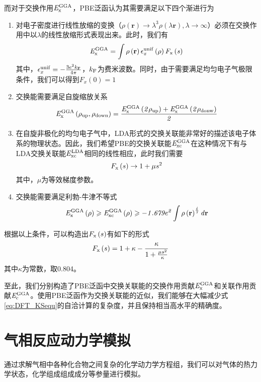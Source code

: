 而对于交换作用$\it E_{\rm x}^{\rm GGA} \it$，PBE泛函认为其需要满足以下四个渐进行为\chinesecolon
\begin{enumerate}
    \item 对电子密度进行线性放缩的变换（$\rho\left({\bm r}\right)\rightarrow \lambda^3\rho(\lambda {\bm r}), \lambda\rightarrow \infty$）必须在交换作用中以$\lambda$的线性放缩形式表现出来。此时，我们有\chinesecolon
    \[
        \it E_{\rm x}^{\rm GGA} \it=\int\rho\left({\mathbf r}\right)\epsilon_x^{\rm unif}\left(\rho\right)F_{\rm x}\left(s\right)
    \]
    其中，$\epsilon_x^{\rm unif}=-\frac{3e^2k_{\rm F}}{4\pi}$，$k_{\rm F}$为费米波数。同时，由于需要满足均匀电子气极限条件，我们可以得到$F_{x}\left(0\right)=1$
    \item 交换能需要满足自旋缩放关系\chinesecolon
    \[
        \it E_{\rm x}^{\rm GGA} \it\left(\rho_{\rm up},\rho_{\rm down}\right)=\frac{\it E_{\rm x}^{\rm GGA} \it\left(2\rho_{\rm up}\right)+\it E_{\rm x}^{\rm GGA} \it\left(2\rho_{\rm donw}\right)}{2}
    \]
    \item 在自旋非极化的均匀电子气中，LDA形式的交换关联能非常好的描述该电子体系的物理状态。因此，我们希望PBE的交换关联能$\it E_{\rm xc}^{\rm GGA} \it$在这种情况下有与LDA交换关联能$\it E_{\rm xc}^{\rm LDA} \it$相同的线性相应，此时我们需要\chinesecolon
    \[
        F_{\rm x}\left(s\right)\rightarrow 1+\mu s^2
    \]
    其中，$\mu$为等效梯度参数。
    \item 交换能需要满足利勃-牛津不等式\chinesecolon
    \[
        \it E_{\rm x}^{\rm GGA} \it\left(\rho\right)\geqslant\it E_{\rm xc}^{\rm GGA} \it\left(\rho\right)\geqslant -1.679e^2\int \rho\left({\mathbf r}\right)^{\frac{4}{3}} d{\mathbf r}
    \]
\end{enumerate}

根据以上条件，可以构造出$F_{\rm x}\left(s\right)$有如下的形式\chinesecolon
\begin{equation}
    F_{\rm x}\left(s\right)=1+\kappa -\frac{\kappa }{1+\frac{\mu s^2}{\kappa}}
\end{equation}
其中$\kappa$为常数，取0.804。

至此，我们分别构造了PBE泛函中交换关联能的交换作用贡献$\it E_{\rm x}^{\rm GGA} \it$和关联作用贡献$\it E_{\rm c}^{\rm GGA} \it$。使用PBE泛函作为交换关联能的近似，我们能够在大幅减少式\ref{eq:DFT_KSequ}的自洽计算的复杂度，并且保持相当高水平的精确度。
\section{气相反应动力学模拟}
通过求解气相中各种化合物之间复杂的化学动力学方程组，我们可以对气体的热力学状态，化学组成组成成分等参量进行模拟。

